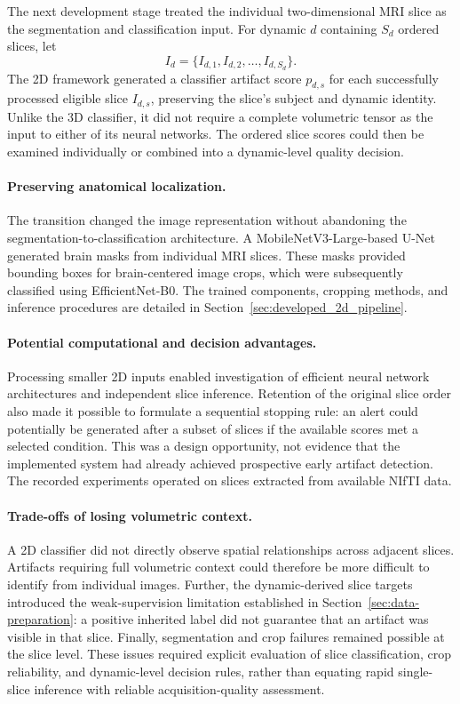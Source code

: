 The next development stage treated the individual two-dimensional MRI slice as the segmentation and classification input. For dynamic $d$ containing $S_d$ ordered slices, let
\begin{equation}
I_d=\{I_{d,1},I_{d,2},\ldots,I_{d,S_d}\}.
\end{equation}
The 2D framework generated a classifier artifact score $p_{d,s}$ for each successfully processed eligible slice $I_{d,s}$, preserving the slice's subject and dynamic identity. Unlike the 3D classifier, it did not require a complete volumetric tensor as the input to either of its neural networks. The ordered slice scores could then be examined individually or combined into a dynamic-level quality decision.

\paragraph{Preserving anatomical localization.}
The transition changed the image representation without abandoning the segmentation-to-classification architecture. A MobileNetV3-Large-based U-Net generated brain masks from individual MRI slices. These masks provided bounding boxes for brain-centered image crops, which were subsequently classified using EfficientNet-B0. The trained components, cropping methods, and inference procedures are detailed in Section~\ref{sec:developed_2d_pipeline}.

\paragraph{Potential computational and decision advantages.}
Processing smaller 2D inputs enabled investigation of efficient neural network architectures and independent slice inference. Retention of the original slice order also made it possible to formulate a sequential stopping rule: an alert could potentially be generated after a subset of slices if the available scores met a selected condition. This was a design opportunity, not evidence that the implemented system had already achieved prospective early artifact detection. The recorded experiments operated on slices extracted from available NIfTI data.

\paragraph{Trade-offs of losing volumetric context.}
A 2D classifier did not directly observe spatial relationships across adjacent slices. Artifacts requiring full volumetric context could therefore be more difficult to identify from individual images. Further, the dynamic-derived slice targets introduced the weak-supervision limitation established in Section~\ref{sec:data-preparation}: a positive inherited label did not guarantee that an artifact was visible in that slice. Finally, segmentation and crop failures remained possible at the slice level. These issues required explicit evaluation of slice classification, crop reliability, and dynamic-level decision rules, rather than equating rapid single-slice inference with reliable acquisition-quality assessment.


